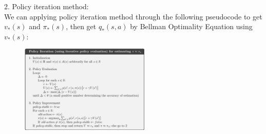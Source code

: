 \begin{homeworkProblem}
2. Policy iteration method: \\
We can applying policy iteration method through the following pseudocode to get $v_*(s)$ and $\pi_*(s)$, then get $q_*(s,a)$ by Bellman Optimality Equation using $v_*(s)$:
\begin{figure}[!htbp]
    \centering
    \includegraphics[width=0.55\textwidth]{./figure/policy_iteration_pseudocode}
    \vspace{-0.5cm}
\end{figure}


\end{homeworkProblem}
